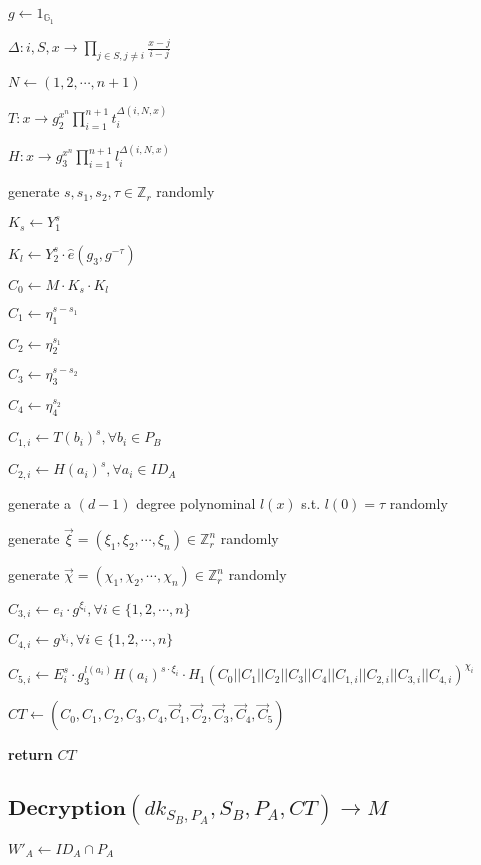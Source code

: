 \documentclass[a4paper]{article}
\begin{document}
$g \gets 1_{\mathbb{G}_1}$

$\Delta: i, S, x \rightarrow \prod\limits_{j \in S, j \neq i} \frac{x - j}{i - j}$

$N \gets (1, 2, \cdots, n + 1)$

$T: x \rightarrow g_2^{x^n} \prod\limits_{i = 1}^{n + 1} t_i^{\Delta(i, N, x)}$

$H: x \rightarrow g_3^{x^n} \prod\limits_{i = 1}^{n + 1} l_i^{\Delta(i, N, x)}$

generate $s, s_1, s_2, \tau \in \mathbb{Z}_r$ randomly

$K_s \gets Y_1^s$

$K_l \gets Y_2^s \cdot \hat{e}(g_3, g^{-\tau})$

$C_0 \gets M \cdot K_s \cdot K_l$

$C_1 \gets \eta_1^{s - s_1}$

$C_2 \gets \eta_2^{s_1}$

$C_3 \gets \eta_3^{s - s_2}$

$C_4 \gets \eta_4^{s_2}$

$C_{1, i} \gets T(b_i)^s, \forall b_i \in P_B$

$C_{2, i} \gets H(a_i)^s, \forall a_i \in ID_A$

generate a $(d - 1)$ degree polynominal $l(x)$ s.t. $l(0) = \tau$ randomly

generate $\vec{\xi} = (\xi_1, \xi_2, \cdots, \xi_n) \in \mathbb{Z}_r^n$ randomly

generate $\vec{\chi} = (\chi_1, \chi_2, \cdots, \chi_n) \in \mathbb{Z}_r^n$ randomly

$C_{3, i} \gets e_i \cdot g^{\xi_i}, \forall i \in \{1, 2, \cdots, n\}$

$C_{4, i} \gets g^{\chi_i}, \forall i \in \{1, 2, \cdots, n\}$

$C_{5, i} \gets E_i^s \cdot g_3^{l(a_i)} H(a_i)^{s \cdot \xi_i} \cdot H_1(C_0 || C_1 || C_2 || C_3 || C_4 || C_{1, i} || C_{2, i} || C_{3, i} || C_{4, i})^{\chi_i}$

$\textit{CT} \gets (C_0, C_1, C_2, C_3, C_4, \vec{C}_1, \vec{C}_2, \vec{C}_3, \vec{C}_4, \vec{C}_5)$

\textbf{return} $\textit{CT}$

\subsection{$\textbf{Decryption}(\textit{dk}_{S_B, P_A}, S_B, P_A, \textit{CT}) \rightarrow M$}

$W'_A \gets ID_A \cap P_A$
\end{document}
